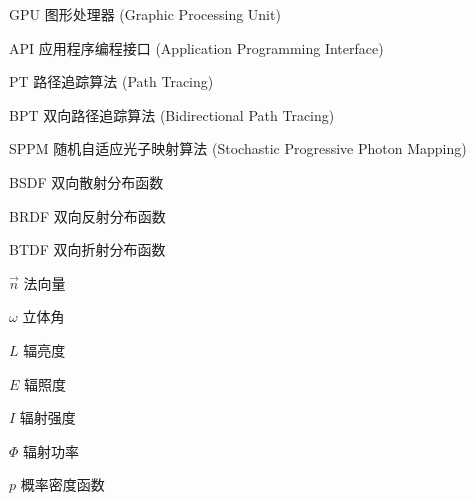 \begin{denotation}[3cm]
\item[GPU] 图形处理器 (Graphic Processing Unit)
\item[API] 应用程序编程接口 (Application Programming Interface)
\item[PT] 路径追踪算法 (Path Tracing)
\item[BPT] 双向路径追踪算法 (Bidirectional Path Tracing)
\item[SPPM] 随机自适应光子映射算法 (Stochastic Progressive Photon Mapping)
\item[BSDF] 双向散射分布函数
\item[BRDF] 双向反射分布函数
\item[BTDF] 双向折射分布函数
\item[$\vec{n}$] 法向量
\item[$\omega$] 立体角
\item[$L$] 辐亮度
\item[$E$] 辐照度
\item[$I$] 辐射强度
\item[$\Phi$] 辐射功率
\item[$p$] 概率密度函数
\end{denotation}





